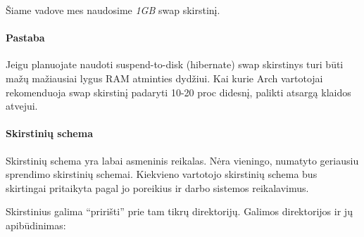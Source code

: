 Šiame vadove mes naudosime \textsl{1GB} swap skirstinį.

\paragraph{Pastaba} Jeigu planuojate naudoti suspend-to-disk
(hibernate) swap skirstinys turi būti mažų mažiausiai lygus RAM
atminties dydžiui. Kai kurie Arch vartotojai rekomenduoja swap
skirstinį padaryti 10-20 proc didesnį, palikti atsargą klaidos
atvejui.

\paragraph{Skirstinių schema}

Skirstinių schema yra labai asmeninis reikalas. Nėra vieningo,
numatyto geriausiu sprendimo skirstinių schemai. Kiekvieno vartotojo
skirstinių schema bus skirtingai pritaikyta pagal jo poreikius ir
darbo sistemos reikalavimus.

Skirstinius galima ``pririšti'' prie tam tikrų direktorijų. Galimos
direktorijos ir jų apibūdinimas:


